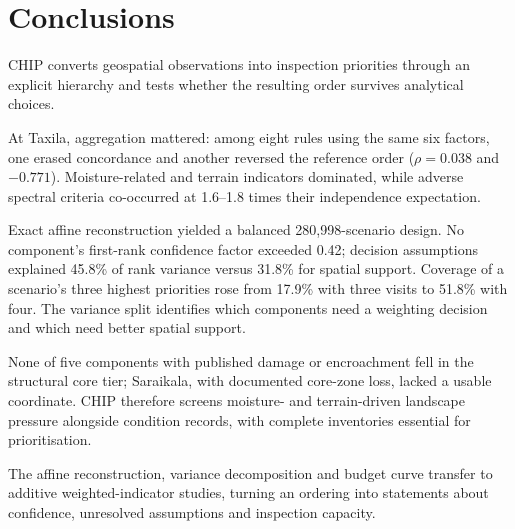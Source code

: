 \section{Conclusions}
CHIP converts geospatial observations into inspection priorities through an explicit hierarchy and tests whether the resulting order survives analytical choices.

At Taxila, aggregation mattered: among eight rules using the same six factors, one erased concordance and another reversed the reference order ($\rho=0.038$ and $-0.771$). Moisture-related and terrain indicators dominated, while adverse spectral criteria co-occurred at 1.6--1.8 times their independence expectation.

Exact affine reconstruction yielded a balanced 280,998-scenario design. No component's first-rank confidence factor exceeded 0.42; decision assumptions explained 45.8\% of rank variance versus 31.8\% for spatial support. Coverage of a scenario's three highest priorities rose from 17.9\% with three visits to 51.8\% with four. The variance split identifies which components need a weighting decision and which need better spatial support.

None of five components with published damage or encroachment fell in the structural core tier; Saraikala, with documented core-zone loss, lacked a usable coordinate. CHIP therefore screens moisture- and terrain-driven landscape pressure alongside condition records, with complete inventories essential for prioritisation.

The affine reconstruction, variance decomposition and budget curve transfer to additive weighted-indicator studies, turning an ordering into statements about confidence, unresolved assumptions and inspection capacity.
